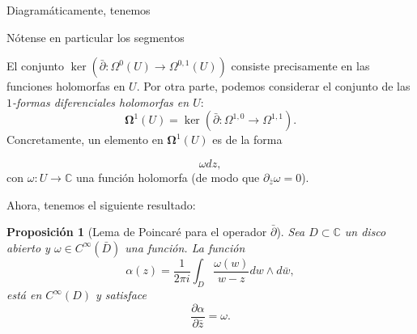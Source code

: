 \documentclass[12pt,a4paper]{article}
\newtheorem{prop}[thm]{Proposición}
\theoremstyle{definition} \newtheorem{defn}[thm]{Definición}
\theoremstyle{definition} \newtheorem{ejemplo}[thm]{Ejemplo}
\theoremstyle{definition} \newtheorem{ejercicio}[thm]{Ejercicio}
\def\CC{\mathbb{C}}
\def\delbar{\bar{\partial}}
\begin{document}
	  
	  Diagramáticamente, tenemos
	  
	  \begin{center}      
	        \end{center}

	  Nótense en particular los segmentos
\begin{center}  \end{center}
El conjunto $\ker(\delbar:\Omega^0(U) \rightarrow \Omega^{0,1}(U))$ consiste precisamente en las funciones holomorfas en $U$. Por otra parte, podemos considerar el conjunto de las \emph{$1$-formas diferenciales holomorfas en $U$}:
\begin{equation*}  \boldsymbol{\Omega}^1(U) = \ker(\bar{\partial}: \Omega^{1,0} \rightarrow \Omega^{1,1}).\end{equation*}
Concretamente, un elemento en $\boldsymbol{\Omega}^1(U)$ es de la forma

\begin{equation*}  \omega dz,\end{equation*} con $\omega:U\rightarrow \CC$ una función holomorfa (de modo que $\partial_{\bar{z}}\omega=0$).

Ahora, tenemos el siguiente resultado:

\begin{prop}[Lema de Poincaré para el operador $\bar{\partial}$]  Sea $D\subset \CC$ un disco abierto y $\omega \in C^\infty(\bar{D})$ una función. La función  \begin{equation*}    \alpha(z) = \frac{1}{2\pi i}\int_D \frac{\omega(w)}{w-z} dw \wedge d\bar{w},  \end{equation*}  está en $C^\infty(D)$ y satisface  \begin{equation*}    \frac{\partial \alpha}{\partial \bar{z}}=\omega.  \end{equation*}\end{prop}
\end{document}
